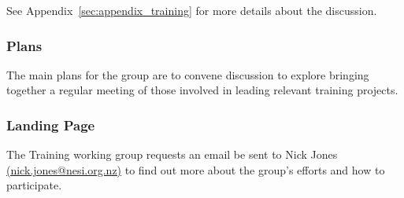 See Appendix~\ref{sec:appendix_training} for more details about the discussion.

\subsubsection{Plans}

The main plans for the group are to convene discussion to explore bringing together a regular meeting of those involved in leading relevant training projects.

\subsubsection{Landing Page}

The Training working group requests an email be sent to Nick Jones \href{mailto:nick.jones@nesi.org.nz}{(nick.jones@nesi.org.nz)} to find out more about the group's efforts and how to participate.
